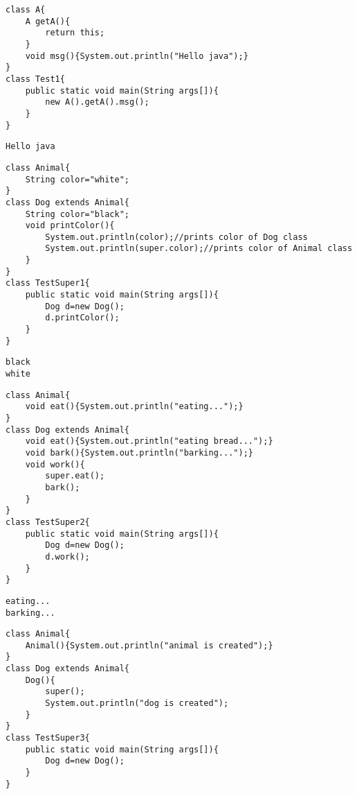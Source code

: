 \documentclass{book}
\def\lthtmlcheckvsize{\ifdim\ht\sizebox<\vsize 
  \ifdim\wd\sizebox<\hsize\expandafter\hfill\fi \expandafter\vfill
  \else\expandafter\vss\fi}%
\begin{document}
{\newpage\clearpage
{}%
\begin{lstlisting}
class A{  
	A getA(){  
		return this;  
	}  
	void msg(){System.out.println("Hello java");}  
}  
class Test1{  
	public static void main(String args[]){  
		new A().getA().msg();  
	}  
}  
\end{lstlisting}%
\lthtmlfigureZ
\lthtmlcheckvsize\clearpage}

{\newpage\clearpage
{}%
\begin{lstlisting}
Hello java
\end{lstlisting}%
\lthtmlfigureZ
\lthtmlcheckvsize\clearpage}

{\newpage\clearpage
{}%
\begin{lstlisting}
class Animal{  
	String color="white";  
}  
class Dog extends Animal{  
	String color="black";  
	void printColor(){  
		System.out.println(color);//prints color of Dog class  
		System.out.println(super.color);//prints color of Animal class  
	}  
}  
class TestSuper1{  
	public static void main(String args[]){  
		Dog d=new Dog();  
		d.printColor();  
	}
}  
\end{lstlisting}%
\lthtmlfigureZ
\lthtmlcheckvsize\clearpage}

{\newpage\clearpage
{}%
\begin{lstlisting}
black
white
\end{lstlisting}%
\lthtmlfigureZ
\lthtmlcheckvsize\clearpage}

{\newpage\clearpage
{}%
\begin{lstlisting}
class Animal{  
	void eat(){System.out.println("eating...");}  
}  
class Dog extends Animal{  
	void eat(){System.out.println("eating bread...");}  
	void bark(){System.out.println("barking...");}  
	void work(){  
		super.eat();  
		bark();  
	}  
}  
class TestSuper2{  
	public static void main(String args[]){  
		Dog d=new Dog();  
		d.work();  
	}
}
\end{lstlisting}%
\lthtmlfigureZ
\lthtmlcheckvsize\clearpage}

{\newpage\clearpage
{}%
\begin{lstlisting}
eating...
barking...
\end{lstlisting}%
\lthtmlfigureZ
\lthtmlcheckvsize\clearpage}

{\newpage\clearpage
{}%
\begin{lstlisting}
class Animal{  
	Animal(){System.out.println("animal is created");}  
}  
class Dog extends Animal{  
	Dog(){  
		super();  
		System.out.println("dog is created");  
	}  
}  
class TestSuper3{  
	public static void main(String args[]){  
		Dog d=new Dog();  
	}
}  
\end{lstlisting}%
\lthtmlfigureZ
\lthtmlcheckvsize\clearpage}
\end{document}
